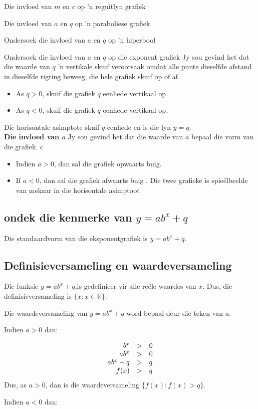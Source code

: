 \begin{Ondersoek}{Die invloed van $m$ en $c$ op 'n reguitlyn grafiek}
\begin{Ondersoek}{Die invloed van $a$ en $q$ op 'n paraboliese grafiek}
\begin{Ondersoek}{Ondersoek die invloed van $a$ en $q$ op 'n hiperbool}
\begin{Ondersoek}{Ondersoek die invloed van $a$ en $q$ op die exponent grafiek}
Jy sou gevind het dat die waarde van $q$ 'n vertikale skuif veroorsaak omdat alle punte dieselfde afstand in dieselfde rigting beweeg, die hele grafiek skuif op of af. 
\begin{itemize}
\item As $q>0$, skuif die grafiek $q$ eenhede vertikaal op. 
\item As $q<0$, skuif die grafiek $q$ eenhede vertikaal op.
\end{itemize}
Die horisontale asimptote skuif $q$ eenhede en is die lyn $y=q$. \vspace{8pt}\\


\textbf{Die invloed van $a$}\newline
Jy sou gevind het dat die waarde van $a$ bepaal die vorm van die grafiek. c
\begin{itemize}
 \item Indien $a>0$, dan sal die grafiek opwaarts buig.
\item If $a<0$, dan sal die grafiek afwaarts buig . Die twee grafieke is spie\"elbeelde van mekaar in die horisontale asimptoot
\end{itemize}

\subsection*{ondek die kenmerke van $y=ab^{x} + q$}
Die standaardvorm van die eksponentgrafiek is $y=ab^{x} + q$.
\subsection*{Definisieversameling en waardeversameling}

Die funksie $y=ab^{x}+q$,is gedefinieer vir alle reële waardes van $x$. Dus, die definisieversameling is $\{x:x\in \mathbb{R}\}$.\par 
Die waardeversameling van $y=ab^{x}+q$ word bepaal deur die teken van $a$.\par 
Indien $a>0$ dan:\par
\begin{equation*}
\begin{array}{ccc}\hfill b^{x}& > & 0\hfill \\
 \hfill ab^{x}& > & 0\hfill \\ 
\hfill ab^{x}+q& > & q\hfill \\ 
\hfill f(x)& > & q\hfill 
\end{array}
\end{equation*}
Dus, as  $a>0$, dan is die waardeversameling  $\{f(x):f(x) > q\}$.\par 
Indien $a<0$ dan:\par 


\end{Ondersoek}
\end{Ondersoek}
\end{Ondersoek}
\end{Ondersoek}
